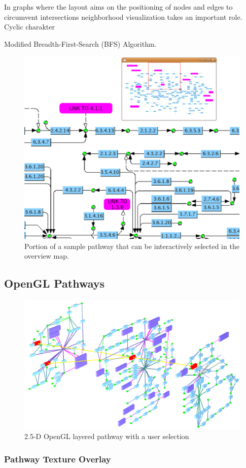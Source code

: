 In graphs where the layout aims on the positioning of nodes and edges to circumvent intersections neighborhood visualization takes an important role. 
Cyclic charakter

Modified Breadth-First-Search (BFS) Algorithm.

\begin{figure}[ht]
  \centering
    \includegraphics[width=0.5\linewidth]{gfx/overview_method}
  \caption{Portion of a sample pathway that can be interactively selected in the overview map.}
  \label{fig:overview_method}
\end{figure}

\subsection{OpenGL Pathways}

\begin{figure}
  \centering
    \includegraphics[width=0.7\linewidth]{gfx/opengl_layered_pathway_without_texture}
  \caption{2.5-D OpenGL layered pathway with a user selection}
  \label{fig:opengl_layered_pathway_without_texture}
\end{figure}

\subsubsection{Pathway Texture Overlay}

